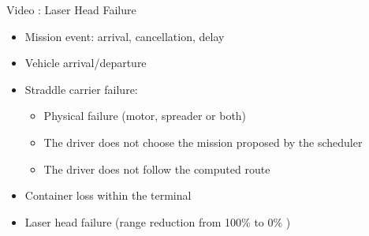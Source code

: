\documentclass{beamer}
\begin{document}
\begin{frame}{Video : Laser Head Failure}
  \label{Laser Head Failure} 
  
  \begin{center}
   \end{center}
  
  \begin{center}
    \hyperlink{callLHF}{\beamerreturnbutton{}}
  \end{center}
  
  \end{frame}

\begin{frame}
    \begin{itemize}
    \item Mission event: arrival, cancellation, delay
    \item Vehicle arrival/departure
     \item Straddle carrier failure:
	  \begin{itemize}
	      \item  Physical failure (motor, spreader or both) \hyperlink{Straddle Carrier Failure}{}
	      \item The driver does not choose the mission proposed by the scheduler
	      \item The driver does not follow the computed route
	  \end{itemize}
    
    \item Container loss within the terminal	%

    \item Laser head failure (range reduction from 100\% to 0\% ) \hyperlink{Laser Head Failure}{}
    \label{callLHF}
   \end{itemize}
  \end{frame}
\end{document}
